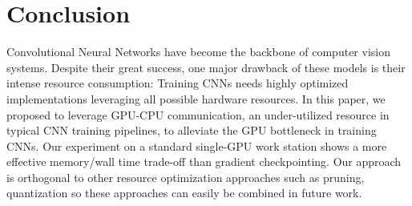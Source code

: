 \documentclass[11pt,onecolumn]{article}
\begin{document}
\section{Conclusion}

Convolutional Neural Networks have become the backbone of computer vision systems.
Despite their great success, one major drawback of these models is their intense resource consumption:
Training CNNs needs highly optimized implementations leveraging all possible hardware resources.
In this paper, we proposed to leverage GPU-CPU communication, 
an under-utilized resource in typical CNN training pipelines,
to alleviate the GPU bottleneck in training CNNs. 
Our experiment on a standard single-GPU work station shows a more
effective memory/wall time trade-off than gradient checkpointing.
Our approach is orthogonal to other resource optimization approaches 
such as pruning, quantization so these approaches can easily be combined in future work.



\end{document}
